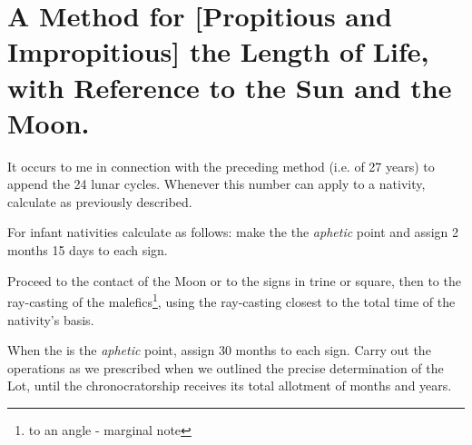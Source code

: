 \section{A Method for [Propitious and Impropitious] the Length of Life, with Reference to the Sun and the Moon.}

It occurs to me in connection with the preceding method (i.e. of 27 years) to append the 24 lunar cycles. Whenever this number can apply to a nativity, calculate as previously described. 

For infant nativities calculate as follows: make the \Moon\xspace the \textit{aphetic} point and assign 2 months 15 days to each sign.

Proceed to the contact of the Moon or to the signs in trine or square, then to the ray-casting of the malefics\footnote{to an angle - marginal note}, using the ray-casting closest to the total time of the nativity’s basis. 

When the \Sun\xspace is the \textit{aphetic} point, assign 30 months to each sign. Carry out the operations as we prescribed when we outlined
the precise determination of the Lot, until the chronocratorship receives its total allotment of months and years.

\newpage